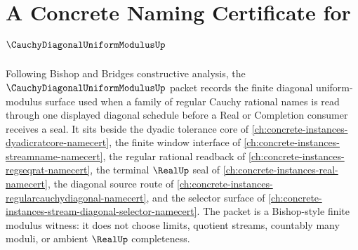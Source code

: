 \chapter{A Concrete Naming Certificate for $\CauchyDiagonalUniformModulusUp$}
\label{ch:concrete-instances-cauchy-diagonal-uniform-modulus-namecert}

Following Bishop and Bridges constructive analysis, the $\CauchyDiagonalUniformModulusUp$ packet records the finite diagonal uniform-modulus surface used when a family of regular Cauchy rational names is read through one displayed diagonal schedule before a Real or Completion consumer receives a seal. It sits beside the dyadic tolerance core of \autoref{ch:concrete-instances-dyadicratcore-namecert}, the finite window interface of \autoref{ch:concrete-instances-streamname-namecert}, the regular rational readback of \autoref{ch:concrete-instances-regseqrat-namecert}, the terminal $\RealUp$ seal of \autoref{ch:concrete-instances-real-namecert}, the diagonal source route of \autoref{ch:concrete-instances-regularcauchydiagonal-namecert}, and the selector surface of \autoref{ch:concrete-instances-stream-diagonal-selector-namecert}. The packet is a Bishop-style finite modulus witness: it does not choose limits, quotient streams, countably many moduli, or ambient $\RealUp$ completeness.

